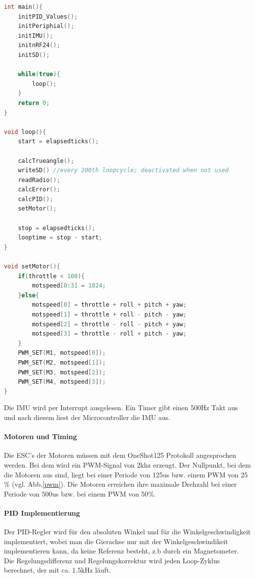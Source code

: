 \documentclass[12pt,a4paper, ngerman]{article}
\begin{document}
\begin{lstlisting}[language=C++,caption=Programmablauf Pseudocode]
int main(){
	initPID_Values();
	initPeriphial();
	initIMU();
	initnRF24();
	initSD();
	
	while(true){
		loop();
	}
	return 0;
}

void loop(){
	start = elapsedticks();
	
	calcTrueangle();
	writeSD() //every 200th loopcycle; deactivated when not used
	readRadio();
	calcError();
	calcPID();
	setMotor();
	
	stop = elapsedticks();
	looptime = stop - start;
}

void setMotor(){
	if(throttle < 100){
		motspeed[0:3] = 1024;	
	}else{
		motspeed[0] = throttle + roll + pitch + yaw; 
		motspeed[1]	= throttle + roll - pitch - yaw;
		motspeed[2]	= throttle - roll - pitch + yaw;
		motspeed[3]	= throttle - roll + pitch - yaw;
	}
	PWM_SET(M1, motspeed[0]);
	PWM_SET(M2, motspeed[1]);
	PWM_SET(M3, motspeed[2]);
	PWM_SET(M4, motspeed[3]);
}
\end{lstlisting}
\noindent
Die IMU wird per Interrupt ausgelesen. Ein Timer gibt einen 500Hz Takt aus und nach diesem liest der Microcontroller die IMU aus.
\newpage
\paragraph{Motoren und Timing}
Die ESC's der Motoren müssen mit dem OneShot125 Protokoll\cite{website:OL_OneShot125} angesprochen werden. Bei dem wird ein PWM-Signal von 2khz erzeugt. Der Nullpunkt, bei dem die Motoren aus sind, liegt bei einer Periode von 125us bzw. einem PWM von 25$\%$ (vgl. Abb.\ref{pwm}). Die Motoren erreichen ihre maximale Drehzahl bei einer Periode von 500us bzw. bei einem PWM von 50$\%$.
\paragraph{PID Implementierung}
Der PID-Regler wird für den absoluten Winkel und für die Winkelgeschwindigkeit implementiert, wobei man die Gierachse nur mit der Winkelgeschwindikeit implementieren kann, da keine Referenz besteht, z.b durch ein Magnetometer. Die Regelungsdifferenz und Regelungskorrektur wird jeden Loop-Zyklus berechnet, der mit ca. 1.5kHz läuft.
\newpage
\end{document}
